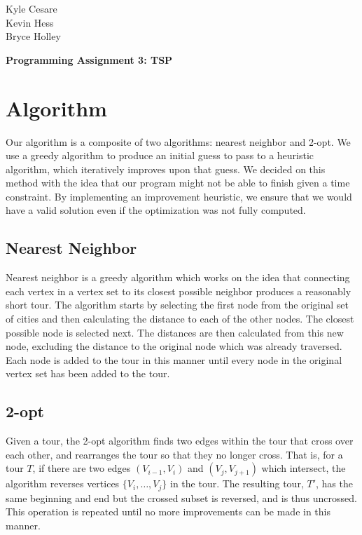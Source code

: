 \documentclass[12pt,letterpaper]{article}
\begin{document}
\begin{flushright}
Kyle Cesare \\
Kevin Hess \\
Bryce Holley
\end{flushright}

{\Large\center\textbf{Programming Assignment 3: TSP} \\}

\section{Algorithm}
Our algorithm is a composite of two algorithms: nearest neighbor and 2-opt. We
use a greedy algorithm to produce an initial guess to pass to a heuristic
algorithm, which iteratively improves upon that guess. We decided on this method
with the idea that our program might not be able to finish given a time
constraint. By implementing an improvement heuristic, we ensure that we would
have a valid solution even if the optimization was not fully computed.

\subsection{Nearest Neighbor}
Nearest neighbor is a greedy algorithm which works on the idea that connecting
each vertex in a vertex set to its closest possible neighbor produces a
reasonably short tour. The algorithm starts by selecting the first node from the
original set of cities and then calculating the distance to each of the other
nodes. The closest possible node is selected next. The distances are then
calculated from this new node, excluding the distance to the original node which
was already traversed. Each node is added to the tour in this manner until every
node in the original vertex set has been added to the tour.

\subsection{2-opt}
Given a tour, the 2-opt algorithm finds two edges within the tour that cross
over each other, and rearranges the tour so that they no longer cross. That is,
for a tour $T$, if there are two edges $(V_{i-1}, V_i)$ and $(V_j, V_{j+1})$
which intersect, the algorithm reverses vertices $\{V_i, \ldots, V_j\}$ in the
tour. The resulting tour, $T'$, has the same beginning and end but the crossed
subset is reversed, and is thus uncrossed. This operation is repeated until no
more improvements can be made in this manner.
\end{document}

